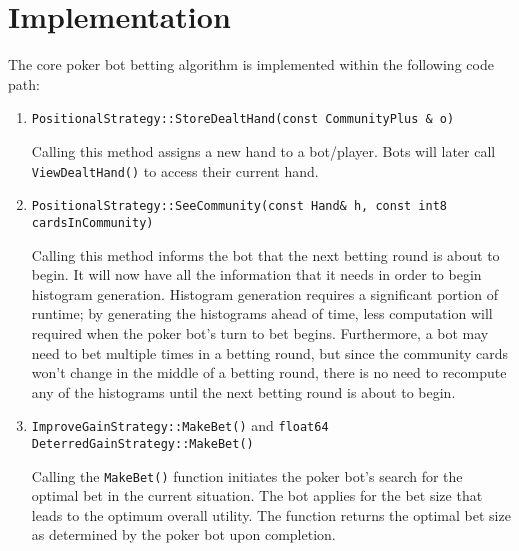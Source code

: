 \section{Implementation}
\label{sec:CompleteImplementation}


The core poker bot betting algorithm is implemented within the following code path:
\begin{enumerate}
\singlespacing
\item \texttt{PositionalStrategy::StoreDealtHand(const CommunityPlus \& o)}

Calling this method assigns a new hand to a bot/player.
Bots will later call \texttt{ViewDealtHand()} to access their current hand.

\item \texttt{PositionalStrategy::SeeCommunity(const Hand\& h, const int8 cardsInCommunity)}

Calling this method informs the bot that the next betting round is about to begin.
It will now have all the information that it needs in order to begin histogram generation.
Histogram generation requires a significant portion of runtime; by generating the histograms ahead of time, less computation will required when the poker bot's turn to bet begins.
Furthermore, a bot may need to bet multiple times in a betting round, but since the community cards won't change in the middle of a betting round, there is no need to recompute any of the histograms until the next betting round is about to begin.

\item \texttt{ImproveGainStrategy::MakeBet()} and \texttt{float64 DeterredGainStrategy::MakeBet()}

Calling the \texttt{MakeBet()} function initiates the poker bot's search for the optimal bet in the current situation.
The bot applies for the bet size that leads to the optimum overall utility.
The function returns the optimal bet size as determined by the poker bot upon completion.
\end{enumerate}


\clearpage
